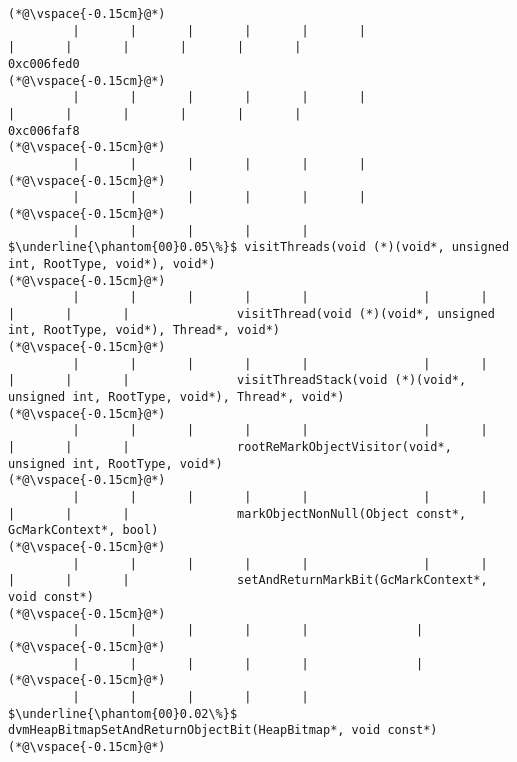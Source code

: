 \begin{lstlisting}[caption=NewDirectByteBuffer, label=profile:C2JNewDirectBuffer-512, numberbychapter=true, frame=lines, float, floatplacement=t]
(*@\vspace{-0.15cm}@*)
         |       |       |       |       |       |                                        |       |       |       |       |       |                                       0xc006fed0
(*@\vspace{-0.15cm}@*)
         |       |       |       |       |       |                                        |       |       |       |       |       |                                       0xc006faf8
(*@\vspace{-0.15cm}@*)
         |       |       |       |       |       |
(*@\vspace{-0.15cm}@*)
         |       |       |       |       |       |
(*@\vspace{-0.15cm}@*)
         |       |       |       |       |        $\underline{\phantom{00}0.05\%}$ visitThreads(void (*)(void*, unsigned int, RootType, void*), void*)
(*@\vspace{-0.15cm}@*)
         |       |       |       |       |                |       |       |       |       |               visitThread(void (*)(void*, unsigned int, RootType, void*), Thread*, void*)
(*@\vspace{-0.15cm}@*)
         |       |       |       |       |                |       |       |       |       |               visitThreadStack(void (*)(void*, unsigned int, RootType, void*), Thread*, void*)
(*@\vspace{-0.15cm}@*)
         |       |       |       |       |                |       |       |       |       |               rootReMarkObjectVisitor(void*, unsigned int, RootType, void*)
(*@\vspace{-0.15cm}@*)
         |       |       |       |       |                |       |       |       |       |               markObjectNonNull(Object const*, GcMarkContext*, bool)
(*@\vspace{-0.15cm}@*)
         |       |       |       |       |                |       |       |       |       |               setAndReturnMarkBit(GcMarkContext*, void const*)
(*@\vspace{-0.15cm}@*)
         |       |       |       |       |               |
(*@\vspace{-0.15cm}@*)
         |       |       |       |       |               |
(*@\vspace{-0.15cm}@*)
         |       |       |       |       |                $\underline{\phantom{00}0.02\%}$ dvmHeapBitmapSetAndReturnObjectBit(HeapBitmap*, void const*)
(*@\vspace{-0.15cm}@*)

\end{lstlisting}
